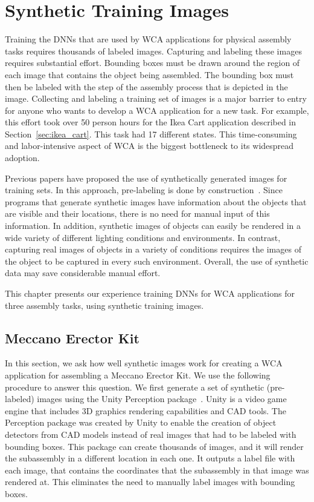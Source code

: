 \chapter{Synthetic Training Images}\label{chap:synthetic}

Training the DNNs that are used by WCA applications for physical assembly tasks
requires thousands of labeled images.
Capturing and labeling these images requires substantial effort.
Bounding boxes must be drawn around the region of each image that
contains the object being assembled.  The bounding box must then be
labeled with the step of the assembly process that is depicted in the
image.  Collecting and labeling a training set of images is a major
barrier to entry for anyone who wants to develop a WCA application for
a new task.
For example, this effort took over 50 person hours for the Ikea Cart application
described in Section~\ref{sec:ikea_cart}.
This task had 17 different states.
This time-consuming and labor-intensive
aspect of WCA is the biggest bottleneck to its widespread adoption.

Previous papers have proposed the use of synthetically generated
images for training sets.  In this approach, pre-labeling is done by
construction~\cite{synthetic_data, DBLP:journals/corr/abs-1809-10790,
  photo2, real_background1, real_background2, real_background3,
  dwibedi}.  Since programs that generate synthetic images have
information about the objects that are visible and their locations,
there is no need for manual input of this information.  In addition,
synthetic images of objects can easily be rendered in a wide variety
of different lighting conditions and environments.  In contrast,
capturing real images of objects in a variety of conditions requires
the images of the object to be captured in every such environment.
Overall, the use of synthetic data may save considerable manual
effort.

This chapter presents our experience training DNNs for WCA applications for
three assembly tasks, using synthetic training images.

\section{Meccano Erector Kit}

In this section, we ask how well synthetic images work for creating a WCA
application for assembling a Meccano Erector Kit.
We use the following procedure to answer this
question.  We first generate a set of synthetic (pre-labeled) images
using the Unity Perception package~\cite{unity}.
Unity is a video game engine that includes 3D graphics rendering capabilities
and CAD tools.
The Perception package was created by Unity to enable the creation of object
detectors from CAD models instead of real images that had to be labeled with
bounding boxes.
This package can create thousands of images, and it will render the subassembly
in a different location in each one.
It outputs a label file with each image, that contains the coordinates that the
subassembly in that image was rendered at.
This eliminates the need to manually label images with bounding boxes.

